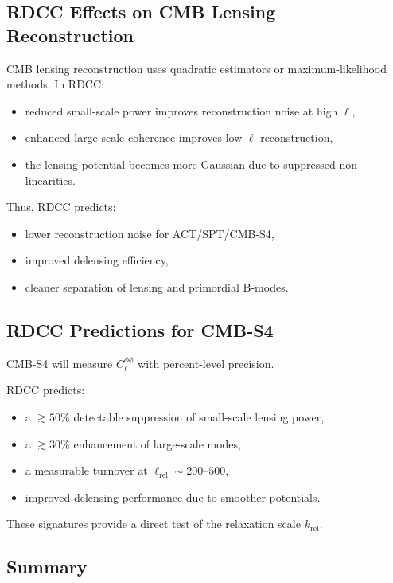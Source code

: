 \documentclass[11pt,a4paper]{article}
\begin{document}
\subsection{RDCC Effects on CMB Lensing Reconstruction}

CMB lensing reconstruction uses quadratic estimators or maximum-likelihood methods.
In RDCC:
\begin{itemize}
\item reduced small-scale power improves reconstruction noise at high $\ell$,
\item enhanced large-scale coherence improves low-$\ell$ reconstruction,
\item the lensing potential becomes more Gaussian due to suppressed non-linearities.
\end{itemize}

Thus, RDCC predicts:
\begin{itemize}
\item lower reconstruction noise for ACT/SPT/CMB-S4,
\item improved delensing efficiency,
\item cleaner separation of lensing and primordial B-modes.
\end{itemize}

\subsection{RDCC Predictions for CMB-S4}

CMB-S4 will measure $C_{\ell}^{\phi\phi}$ with percent-level precision.

RDCC predicts:
\begin{itemize}
\item a $\gtrsim 50\%$ detectable suppression of small-scale lensing power,
\item a $\gtrsim 30\%$ enhancement of large-scale modes,
\item a measurable turnover at $\ell_{\mathrm{rel}} \sim 200$–$500$,
\item improved delensing performance due to smoother potentials.
\end{itemize}

These signatures provide a direct test of the relaxation scale $k_{\mathrm{rel}}$.

\subsection{Summary}
\end{document}
